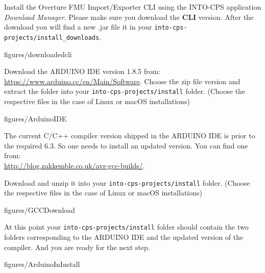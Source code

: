 \documentclass[11pt,a4paper]{../tutorial}
\begin{document}
\begin{instructions} 

\item Install the Overture FMU Import/Exporter CLI using the INTO-CPS
	application \emph{Download Manager}. Please make sure you download the
	\textbf{CLI} version. After the download you will find a new .jar file it in your \texttt{into-cps-projects/install\_downloads}. 
	
	\begin{annotation}[width=0.85\linewidth]{figures/downloadedcli}
	\end{annotation}

	\newpage
\item Download the ARDUINO IDE version 1.8.5 from:\\
	\url{https://www.arduino.cc/en/Main/Software}.  Choose the zip file
	version and extract the folder into your
	\texttt{into-cps-projects/install} folder. (Choose the respective files in the case of Linux or macOS installations)

	\begin{annotation}[width=0.85\linewidth, trim= {0 6cm 0 0},clip]{figures/ArduinoIDE}
	\end{annotation}


\item The current C/C++ compiler version shipped in the ARDUINO IDE is prior to the required 6.3. So one needs to install an updated version. You can find one from:\\
	\url{http://blog.zakkemble.co.uk/avr-gcc-builds/}. 
	
	Download and unzip it into your  \texttt{into-cps-projects/install} folder. (Choose the respective files in the case of Linux or macOS installations)


	\begin{annotation}[width=0.85\linewidth, trim= {0 6cm 0 0},clip]{figures/GCCDownload}
	\end{annotation}

\newpage
\item At this point your \texttt{into-cps-projects/install} folder should contain the two folders corresponding to the ARDUINO IDE and the updated version of the compiler. And you are ready for the next step. 

	\begin{annotation}[width=0.85\linewidth]{figures/ArduinoInInstall}
	\end{annotation}
\newpage
\end{instructions}
\end{document}
